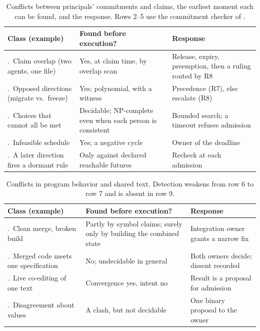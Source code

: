 \begin{table}[tp]
\centering
\caption{Conflicts between principals' commitments and claims, the earliest
moment each can be found, and the response. Rows 2--5 use the commitment
checker of .}
\label{tab:ls-conflict-classes}
\small
\renewcommand{\arraystretch}{1.15}
\begin{tabularx}{\linewidth}{@{}>{\raggedright\arraybackslash}X >{\raggedright\arraybackslash}X >{\raggedright\arraybackslash}X@{}}
\toprule
\textbf{Class (example)} & \textbf{Found before execution?} & \textbf{Response} \\
\midrule
1.\ Claim overlap (two agents, one file) & Yes, at claim time, by overlap scan & Release, expiry, preemption, then a ruling routed by R8 \\
2.\ Opposed directions (migrate vs.\ freeze) & Yes; polynomial, with a witness & Precedence (R7), else escalate (R8) \\
3.\ Choices that cannot all be met & Decidable; NP-complete even when each person is consistent & Bounded search; a timeout refuses admission \\
4.\ Infeasible schedule & Yes; a negative cycle & Owner of the deadline \\
5.\ A later direction fires a dormant rule & Only against declared reachable futures & Recheck at each admission \\
\bottomrule
\end{tabularx}
\end{table}

\begin{table}[tp]
\centering
\caption{Conflicts in program behavior and shared text. Detection weakens from
row 6 to row 7 and is absent in row 9.}
\label{tab:ls-conflict-classes-code}
\small
\renewcommand{\arraystretch}{1.15}
\begin{tabularx}{\linewidth}{@{}>{\raggedright\arraybackslash}X >{\raggedright\arraybackslash}X >{\raggedright\arraybackslash}X@{}}
\toprule
\textbf{Class (example)} & \textbf{Found before execution?} & \textbf{Response} \\
\midrule
6.\ Clean merge, broken build & Partly by symbol claims; surely only by building the combined state & Integration owner grants a narrow fix \\
7.\ Merged code meets one specification & No; undecidable in general & Both owners decide; dissent recorded \\
8.\ Live co-editing of one text & Convergence yes, intent no & Result is a proposal for admission \\
9.\ Disagreement about values & A clash, but not decidable & One binary proposal to the owner \\
\bottomrule
\end{tabularx}
\end{table}

